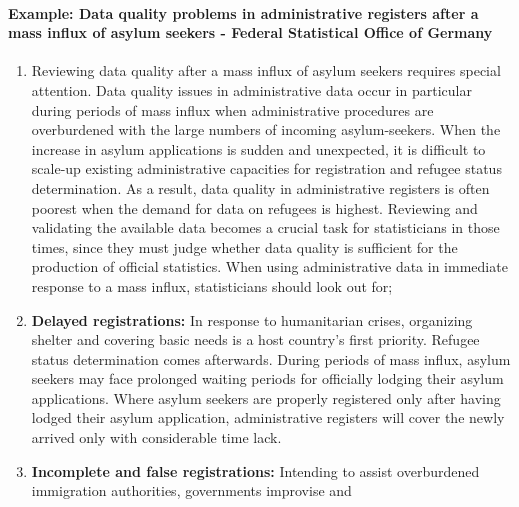 \documentclass[
]{article}
\begin{document}
\hypertarget{example-data-quality-problems-in-administrative-registers-after-a-mass-influx-of-asylum-seekers---federal-statistical-office-of-germany-1}{%
\paragraph{\texorpdfstring{Example: \textbf{Data quality problems in administrative registers after a mass influx of asylum seekers - Federal Statistical Office of Germany}}{Example: Data quality problems in administrative registers after a mass influx of asylum seekers - Federal Statistical Office of Germany}}\label{example-data-quality-problems-in-administrative-registers-after-a-mass-influx-of-asylum-seekers---federal-statistical-office-of-germany-1}}

\begin{enumerate}
\def\labelenumi{\arabic{enumi}.}
\setcounter{enumi}{384}
\item
  Reviewing data quality after a mass influx of asylum seekers
  requires special attention. Data quality issues in administrative
  data occur in particular during periods of mass influx when
  administrative procedures are overburdened with the large numbers of
  incoming asylum-seekers. When the increase in asylum applications is
  sudden and unexpected, it is difficult to scale-up existing
  administrative capacities for registration and refugee status
  determination. As a result, data quality in administrative registers
  is often poorest when the demand for data on refugees is highest.
  Reviewing and validating the available data becomes a crucial task
  for statisticians in those times, since they must judge whether data
  quality is sufficient for the production of official statistics.
  When using administrative data in immediate response to a mass
  influx, statisticians should look out for;
\item
  \textbf{Delayed registrations:} In response to humanitarian crises,
  organizing shelter and covering basic needs is a host country's
  first priority. Refugee status determination comes afterwards.
  During periods of mass influx, asylum seekers may face prolonged
  waiting periods for officially lodging their asylum applications.
  Where asylum seekers are properly registered only after having
  lodged their asylum application, administrative registers will cover
  the newly arrived only with considerable time lack.
\item
  \textbf{Incomplete and false registrations:} Intending to assist
  overburdened immigration authorities, governments improvise and

\end{enumerate}
\end{document}
